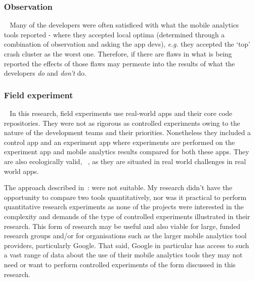 \subsubsection{Observation}~\label{section-observation-research-method}
Many of the developers were often satisficed with what the mobile analytics tools reported - where they accepted local optima (determined through a combination of observation and asking the app devs), \textit{e.g.} they accepted the `top' crash cluster as the worst one. Therefore, if there are flaws in what is being reported the effects of those flaws may permeate into the results of what the developers \textit{do} and \textit{don't} do. 

\subsubsection{Field experiment}~\label{section-field-experiment-method}
In this research, field experiments use real-world apps and their core code repositories. They were not as rigorous as controlled experiments owing to the nature of the development teams and their priorities. Nonetheless they included a control app and an experiment app where experiments are performed on the experiment app and mobile analytics results compared for both these apps. They are also ecologically valid, ~\citep[p.126]{Ko2015_a_practical_guide_to_controlled_experiments_of_sw_eng_tools_with_human_participants}, as they are situated in real world challenges in real world apps.

The approach described in~\citep{Ko2015_a_practical_guide_to_controlled_experiments_of_sw_eng_tools_with_human_participants}: were not suitable. My research didn't have the opportunity to compare two tools quantitatively, nor was it practical to perform quantitative research experiments as none of the projects were interested in the complexity and demands of the type of controlled experiments illustrated in their research. This form of research may be useful and also viable for large, funded research groups and/or for organisations such as the larger mobile analytics tool providers, particularly Google. That said, Google in particular has access to such a vast range of data about the use of their mobile analytics tools they may not need or want to perform controlled experiments of the form discussed in this research.

